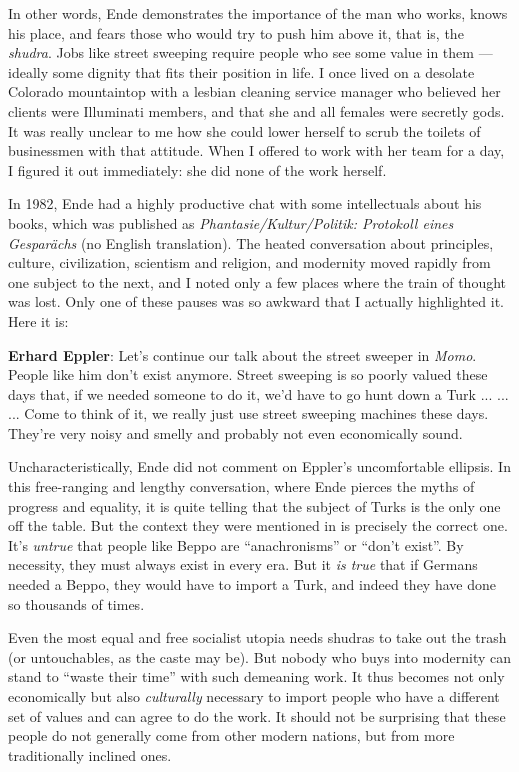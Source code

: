 In other words, Ende demonstrates the importance of the man who works, knows his place, and fears those who would try to push him above it, that is, the \emph{shudra}. Jobs like street sweeping require people who see some value in them --- ideally some dignity that fits their position in life. I once lived on a desolate Colorado mountaintop with a lesbian cleaning service manager who believed her clients were Illuminati members, and that she and all females were secretly gods. It was really unclear to me how she could lower herself to scrub the toilets of businessmen with that attitude. When I offered to work with her team for a day, I figured it out immediately: she did none of the work herself.

In 1982, Ende had a highly productive chat with some intellectuals about his books, which was published as \emph{Phantasie/Kultur/Politik: Protokoll eines Gesparächs} (no English translation). The heated conversation about principles, culture, civilization, scientism and religion, and modernity moved rapidly from one subject to the next, and I noted only a few places where the train of thought was lost. Only one of these pauses was so awkward that I actually highlighted it. Here it is:

\begin{quotex}
\textbf{Erhard Eppler}: Let's continue our talk about the street sweeper in \emph{Momo}. People like him don't exist anymore. Street sweeping is so poorly valued these days that, if we needed someone to do it, we'd have to go hunt down a Turk ... ... ... Come to think of it, we really just use street sweeping machines these days. They're very noisy and smelly and probably not even economically sound.
\end{quotex}


Uncharacteristically, Ende did not comment on Eppler's uncomfortable ellipsis. In this free-ranging and lengthy conversation, where Ende pierces the myths of progress and equality, it is quite telling that the subject of Turks is the only one off the table. But the context they were mentioned in is precisely the correct one. It's \emph{untrue} that people like Beppo are ``anachronisms'' or ``don't exist''. By necessity, they must always exist in every era. But it \emph{is true} that if Germans needed a Beppo, they would have to import a Turk, and indeed they have done so thousands of times.

Even the most equal and free socialist utopia needs shudras to take out the trash (or untouchables, as the caste may be). But nobody who buys into modernity can stand to ``waste their time'' with such demeaning work. It thus becomes not only economically but also \emph{culturally} necessary to import people who have a different set of values and can agree to do the work. It should not be surprising that these people do not generally come from other modern nations, but from more traditionally inclined ones.

